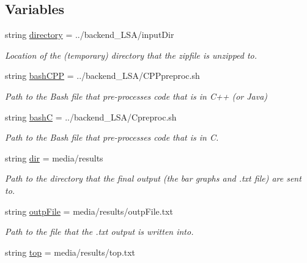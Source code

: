\subsection*{Variables}
\begin{DoxyCompactItemize}
\item 
string \hyperlink{namespacemain_back_a1c89e94124b1c6fedb3a2c9fe2d299c4}{directory} = \textquotesingle{}../backend\+\_\+\+L\+SA/input\+Dir\textquotesingle{}
\begin{DoxyCompactList}\small\item\em Location of the (temporary) directory that the zipfile is unzipped to. \end{DoxyCompactList}\item 
string \hyperlink{namespacemain_back_a926b9a8bc31c40a32db4d060aeb2a6ef}{bash\+C\+PP} = \textquotesingle{}../backend\+\_\+\+L\+SA/C\+P\+Ppreproc.\+sh\textquotesingle{}
\begin{DoxyCompactList}\small\item\em Path to the Bash file that pre-\/processes code that is in C++ (or Java) \end{DoxyCompactList}\item 
string \hyperlink{namespacemain_back_a0b5af764dbf53bd6ff0203d136bba033}{bashC} = \textquotesingle{}../backend\+\_\+\+L\+SA/Cpreproc.\+sh\textquotesingle{}
\begin{DoxyCompactList}\small\item\em Path to the Bash file that pre-\/processes code that is in C. \end{DoxyCompactList}\item 
string \hyperlink{namespacemain_back_a3373b5f631222030da4d68399961e046}{dir} = \textquotesingle{}media/results\textquotesingle{}
\begin{DoxyCompactList}\small\item\em Path to the directory that the final output (the bar graphs and .txt file) are sent to. \end{DoxyCompactList}\item 
string \hyperlink{namespacemain_back_ad40247629e5684702dc93dd647dfd608}{outp\+File} = \textquotesingle{}media/results/outp\+File.\+txt\textquotesingle{}
\begin{DoxyCompactList}\small\item\em Path to the file that the .txt output is written into. \end{DoxyCompactList}\item 
string \hyperlink{namespacemain_back_abeb9019342053389159ea0497b6b89d2}{top} = \textquotesingle{}media/results/top.\+txt\textquotesingle{}

\end{DoxyCompactItemize}
